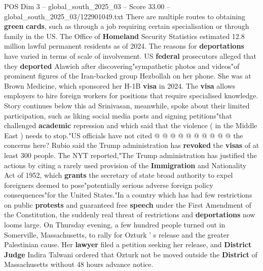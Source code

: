 \begin{textsample}{POS Dim 3 – global\_south\_2025\_03 – Score 33.00 – global\_south\_2025\_03/122901049.txt}
There are multiple routes to obtaining \textbf{green} \textbf{cards}, such as through a job requiring certain specialisation or through family in the US.
The Office of \textbf{Homeland} Security Statistics estimated 12.8 million lawful permanent residents as of 2024.
The reasons for \textbf{deportations} have varied in terms of scale of involvement.
US \textbf{federal} prosecutors alleged that they \textbf{deported} Alawieh after discovering"sympathetic photos and videos"of prominent figures of the Iran-backed group Hezbollah on her phone.
She was at Brown Medicine, which sponsored her H-1B \textbf{visa} in 2024.
The \textbf{visa} allows employers to hire foreign workers for positions that require specialised knowledge.
Story continues below this ad Srinivasan, meanwhile, spoke about their limited participation, such as liking social media posts and signing petitions"that challenged \textbf{academic} repression and which said that the violence ( in the Middle East ) needs to stop."US officials have not cited @ @ @ @ @ @ @ @ @ @ the concerns here?
Rubio said the Trump administration has \textbf{revoked} the \textbf{visas} of at least 300 people.
The NYT reported,"The Trump administration has justified the actions by citing a rarely used provision of the \textbf{Immigration} and Nationality Act of 1952, which \textbf{grants} the secretary of state broad authority to expel foreigners deemed to pose"potentially serious adverse foreign policy consequences"for the United States."In a country which has had few restrictions on public \textbf{protests} and guaranteed free \textbf{speech} under the First Amendment of the Constitution, the suddenly real threat of restrictions and \textbf{deportations} now looms large.
On Thursday evening, a few hundred people turned out in Somerville, Massachusetts, to rally for Ozturk ' s release and the greater Palestinian cause.
Her \textbf{lawyer} filed a petition seeking her release, and \textbf{District} \textbf{Judge} Indira Talwani ordered that Ozturk not be moved outside the \textbf{District} of Massachusetts without 48 hours advance notice.

\end{textsample}
